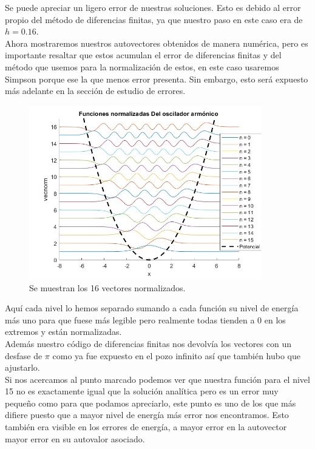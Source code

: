 \documentclass[12pt]{article}
\begin{document}
    Se puede apreciar un ligero error de nuestras soluciones. Esto es debido al error propio del método de diferencias finitas, ya que nuestro paso en este caso era de $h=0.16$.\\
    
    Ahora mostraremos nuestros autovectores obtenidos de manera numérica, pero es importante resaltar que estos acumulan el error de diferencias finitas y del método que usemos para la normalización de estos, en este caso usaremos Simpson porque ese la que menos error presenta. Sin embargo, esto será expuesto más adelante en la sección de estudio de errores.
    
    \begin{figure}[H]
        \centering
        \includegraphics[width=0.9\textwidth]{fotos/16funcionesoscilador.jpg}
        \caption{Se muestran los 16 vectores normalizados.}
        \label{PolinomiosHermite}
    \end{figure}
    
    Aquí cada nivel lo hemos separado sumando a cada función su nivel de energía más uno para que fuese más legible pero realmente todas tienden a 0 en los extremos y están normalizadas.\\
    
    Además nuestro código de diferencias finitas nos devolvía los vectores con un desfase de $\pi$ como ya fue expuesto en el pozo infinito así que también hubo que ajustarlo. \\
    
    Si nos acercamos al punto marcado podemos ver que nuestra función para el nivel 15 no es exactamente igual que la solución analítica pero es un error muy pequeño como para que podamos apreciarlo, este punto es uno de los que más difiere puesto que a mayor nivel de energía más error nos encontramos. Esto también era visible en los errores de energía, a mayor error en la autovector mayor error en su autovalor asociado.
    
\end{document}
